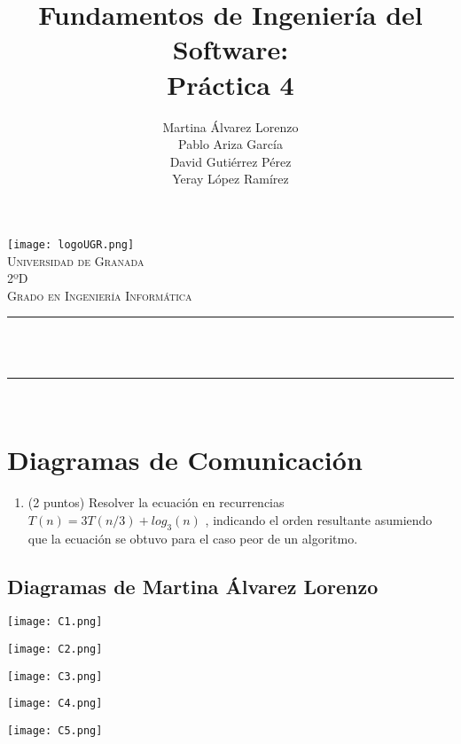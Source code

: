 \documentclass[12pt, spanish]{article}
\title{Fundamentos de Ingeniería del Software:\\
Práctica 4  \hspace{0.05cm} }
\date{}
\author{
\begin{center}
Martina Álvarez Lorenzo  \\
Pablo Ariza García  \\
David Gutiérrez Pérez  \\
Yeray López Ramírez \\
\end{center}
}
\makeatletter
\let\thetitle\@title
\let\theauthor\@author
\makeatother
\begin{document}

\begin{titlepage}
  \centering
  \vspace*{0.5 cm}
  \texttt{[image: logoUGR.png]}\\[1.0 cm]
  \textsc{\LARGE Universidad de Granada}\\[2.0 cm]
  \textsc{\large 2ºD}\\[0.5 cm]
  \textsc{\large Grado en Ingeniería Informática}\\[0.5 cm]              
  \rule{\linewidth}{0.2 mm} \\[0.4 cm]
  { \huge \bfseries \thetitle}\\
  \rule{\linewidth}{0.2 mm} \\[1.5 cm]
  
      
  \theauthor

  \vfill
  
\end{titlepage}

\newpage



\tableofcontents
\pagebreak

\section{Diagramas de Comunicación}

\begin{enumerate}
 \item (2 puntos) Resolver la ecuación en recurrencias ${T(n) = 3T(n/3) + log_3(n)}$ , indicando el orden resultante asumiendo que la ecuación se obtuvo para el caso peor de un algoritmo.
\end{enumerate}
\subsection{Diagramas de Martina Álvarez Lorenzo}
\begin{centering}\texttt{[image: C1.png]}\\[1.0 cm]\end{centering}
\begin{centering}\texttt{[image: C2.png]}\\[1.0 cm]\end{centering}
\begin{centering}\texttt{[image: C3.png]}\\[1.0 cm]\end{centering}
\begin{centering}\texttt{[image: C4.png]}\\[1.0 cm]\end{centering} %
\begin{centering}\texttt{[image: C5.png]}\\[1.0 cm]\end{centering}
\end{document}
